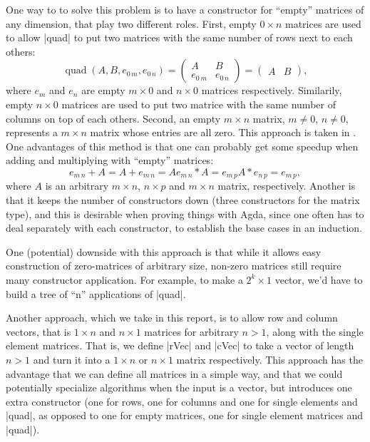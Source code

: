 \label{Section:Empty-Matrices}
One way to to solve this problem is to have a constructor for ``empty'' matrices of any dimension, that play two different roles. First, empty $0 \times n$ matrices are used to allow |quad| to put two matrices with the same number of rows next to each others:
\begin{equation}
\operatorname{quad}(A, B, e_{0\,m}, e_{0\,n}) =
\begin{pmatrix}
  A & B \\
  e_{0\,m} & e_{0\,n}
\end{pmatrix} = 
\begin{pmatrix}
  A & B
\end{pmatrix},
\end{equation}
where $e_m$ and $e_n$ are empty $m \times 0$ and $n\times 0$ matrices respectively. Similarily, empty $n \times 0$ matrices are used to put two matrice with the same number of columns on top of each others. Second, an empty $m \times n$ matrix, $m \ne 0$, $n \ne 0$, represents a $m \times n$ matrix whose entries are all zero. This approach is taken in \cite{JP-PP}. One advantages of this method is that one can probably get some speedup when adding and multiplying with ``empty'' matrices:
\begin{equation*}
  e_{m\, n} + A = A + e_{m\,n} = A
  e_{m\, n} * A = e_{m\,p}
  A * e_{n\,p}  = e_{m\,p},
\end{equation*}
where $A$ is an arbitrary $m \times n$, $n \times p$ and $m \times n$ matrix, respectively.
Another is that it keeps the number of constructors down (three constructors for the matrix type), and this is desirable when proving things with Agda, since one often has to deal separately with each constructor, to establish the base cases in an induction.

One (potential) downside with this approach is that while it allows easy construction of zero-matrices of arbitrary size, non-zero matrices still require many constructor application. For example, to make a $2^k \times 1$ vector, we'd have to build a tree of ``n''  applications of |quad|.

Another approach, which we take in this report, is to allow row and column vectors, that is $1 \times n$ and $n \times 1$ matrices for arbitrary $n > 1$, along with the single element matrices. That is, we define |rVec| and |cVec| to take a vector of length $n > 1$ and turn it into a $1 \times n$ or $n \times 1$ matrix respectively.
This approach has the advantage that we can define all matrices in a simple way, and that we could potentially specialize algorithms when the input is a vector, but introduces one extra constructor (one for rows, one for columns and one for single elements and |quad|, as opposed to one for empty matrices, one for single element matrices and |quad|).

